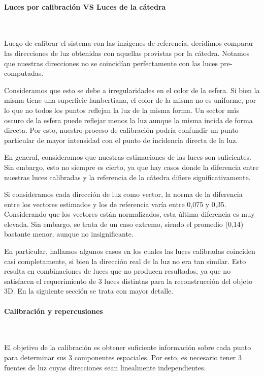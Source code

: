 \paragraph{Luces por calibración VS Luces de la cátedra}
\

Luego de calibrar el sistema con las imágenes de referencia, decidimos comparar
las direcciones de luz obtenidas con aquellas provistas por la cátedra. Notamos
que nuestras direcciones no se coincidían perfectamente con las luces pre-computadas.

Consideramos que esto se debe a irregularidades en el color de la esfera. Si bien la misma
tiene una superficie lambertiana, el color de la misma no es uniforme, por lo que no
todos los puntos reflejan la luz de la misma forma. Un sector más oscuro de la esfera
puede reflejar menos la luz aunque la misma incida de forma directa. Por esto, nuestro proceso
de calibración podría confundir un punto particular de mayor intensidad con el punto de
incidencia directa de la luz.

En general, consideramos que nuestras estimaciones de las luces son suficientes.
Sin embargo, esto no siempre es cierto, ya que hay casos donde la diferencia
entre nuestras luces calibradas y la referencia de la cátedra difiere significativamente.

Si consideramos cada dirección de luz como vector, la norma de la diferencia
entre los vectores estimados y los de referencia varía entre 0,075 y 0,35.
Considerando que los vectores están normalizados, esta última diferencia es muy elevada.
Sin embargo, se trata de un caso extremo, siendo el promedio (0,14)
bastante menor, aunque no insignificante.

En particular, hallamos algunos casos en los cuales las luces calibradas coinciden casi
completamente, si bien la dirección real de la luz no era tan similar. Esto resulta en
combinaciones de luces que no producen resultados, ya que no satisfacen el
requerimiento de 3 luces distintas para la reconstrucción del objeto 3D.
En la siguiente sección se trata con mayor detalle.

\paragraph{Calibración y repercusiones}
\

El objetivo de la calibración es obtener suficiente información sobre cada punto
para determinar sus 3 componentes espaciales. Por esto, es necesario tener 3
fuentes de luz cuyas direcciones sean linealmente independientes.

